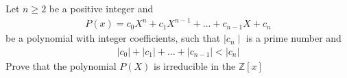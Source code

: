 Let $n\geq 2$ be a positive integer and
\begin{align*} P(x) = c_0 X^n + c_1 X^{n-1} + \ldots + c_{n-1} X +c_n \end{align*}be a polynomial with integer coefficients, such that $\mid c_n \mid$ is a prime number and
\begin{align*} |c_0| + |c_1| + \ldots + |c_{n-1}| < |c_n| \end{align*}Prove that the polynomial $P(X)$ is irreducible in the $\mathbb{Z}[x]$